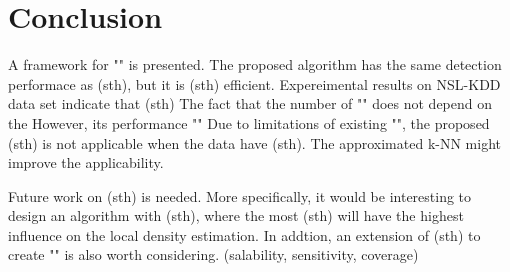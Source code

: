 \section{Conclusion}
A framework for "" is presented.
The proposed algorithm has the same detection performace as (sth), but it is (sth) efficient.
Expereimental results on NSL-KDD data set indicate that (sth) 
The fact that the number of "" does not depend on the 
However, its performance ""
Due to limitations of existing "", the proposed (sth) is not applicable when the data have (sth).
The approximated k-NN might improve the applicability.

Future work on (sth) is needed. More specifically, it would be interesting to design an algorithm with (sth), where the most (sth) will have the highest influence on the local density estimation.
In addtion, an extension of (sth) to create "" is also worth considering. (salability, sensitivity, coverage)
